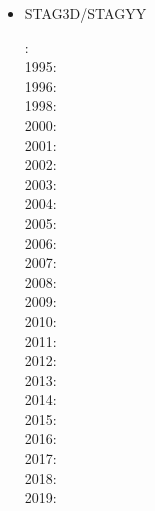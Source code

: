 \begin{itemize}
\item {\codefont STAG3D}/{\codefont STAGYY}  

{\small
{}: \cite{tackley94}\\
1995: \cite{scta95}\\
1996: \cite{tack96}\cite{tack96b}\\
1998: \cite{most98}\cite{thta98}\\
2000: \cite{tack00}\cite{tack00b}\cite{tack00c}\cite{tack00d}\\
2001: \cite{tack01}\\
2002: \cite{falt02}\cite{tack02}\cite{taxi02}\\
2003: \cite{taxi03}\\
2004: \cite{xita04b}\cite{xita04}\cite{nata04}\cite{nata04b}\cite{nata04c}\cite{scmo04}\\
2005: \cite{grlt05}\cite{fasa05}\cite{nata05}\cite{nata05b}\cite{nabu05}\\
2006: \cite{mita06}\\
2007: \cite{grlt07}\cite{grlt07b}\cite{heta07}\cite{tanh07}\\
2008: \cite{deta08}\cite{hets08}\cite{heta08}\cite{sata08}\cite{nata08}\cite{tack08}\cite{vata08}\\
2009: \cite{deta09}\cite{natd09}\cite{keta09}\\
2010: \cite{detn10}\cite{nata10}\cite{moht10}\cite{sate10}\cite{natd10}\\
2011: \cite{rota11}\cite{gokg11}\cite{nata11}\\
2012: \cite{roct12}\cite{crtm12}\cite{cosr13}\cite{deyt12}\cite{dect12}\cite{arta12}\cite{natd12}
      \cite{ullc12}\\
2013: \cite{ruts13}\cite{taab13}\cite{nata13}\cite{mowe13}\\
2014: \cite{yadl14}\cite{crta14}\cite{roct14}\cite{cort14}\cite{becr14}\cite{lidt14}\cite{robg14}
      \cite{nata14}\\
2015: \cite{bect15}\cite{delt15}\\
2016: \cite{sisc16}\cite{crta16}\\
2017: \cite{cogu17}\cite{pest17}\\
2018: \cite{cosh18}\cite{bofc18}\cite{cold18}\cite{arcf18}\cite{cram18}\cite{crli18}\cite{lalt18}\\
2019: \cite{gult19}\cite{argc19}\cite{deli19}\cite{pact19}\cite{cohf19}\cite{crcm19}\cite{ulcw19}
}


\end{itemize}
